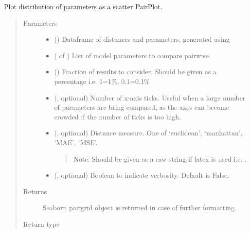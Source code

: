 \documentclass[letterpaper,10pt,english]{sphinxmanual}
\begin{document}
\begin{fulllineitems}
\label{\detokenize{misc:bayescmd.results_handling.scatter_dist_plot}}
Plot distribution of parameters as a scatter PairPlot.
\begin{quote}\begin{description}
\item[{Parameters}] \leavevmode\begin{itemize}
\item {} 
 () \textendash{} Dataframe of distances and parameters, generated using
{\hyperref[\detokenize{misc:bayescmd.results_handling.data_import}]{}}

\item {} 
 ( of ) \textendash{} List of model parameters to compare pairwise.

\item {} 
 () \textendash{} Fraction of results to consider. Should be given as a percentage i.e.
1=1\%, 0.1=0.1\%

\item {} 
 (, optional) \textendash{} Number of x-axis ticks. Useful when a large number of parameters are
bring compared, as the axes can become crowded if the number of ticks
is too high.

\item {} 
 (, optional) \textendash{} 
Distance measure. One of ‘euclidean’, ‘manhattan’, ‘MAE’, ‘MSE’.
\begin{quote}

Note: Should be given  as a raw string if latex is used i.e.
.
\end{quote}


\item {} 
 (, optional) \textendash{} Boolean to indicate verbosity. Default is False.

\end{itemize}

\item[{Returns}] \leavevmode
{} \textendash{} Seaborn pairgrid object is returned in case of further formatting.

\item[{Return type}] \leavevmode
{}

\end{description}\end{quote}

\end{fulllineitems}
\end{document}
